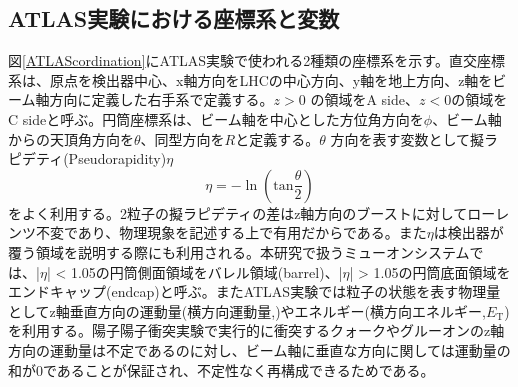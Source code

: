 \subsection{ATLAS実験における座標系と変数}
図\ref{ATLAScordination}にATLAS実験で使われる2種類の座標系を示す。直交座標系は、原点を検出器中心、x軸方向をLHCの中心方向、y軸を地上方向、z軸をビーム軸方向に定義した右手系で定義する。$z>0$ の領域をA side、$z<0$の領域をC sideと呼ぶ。円筒座標系は、ビーム軸を中心とした方位角方向を$\phi$、ビーム軸からの天頂角方向を$\theta$、同型方向を$R$と定義する。$\theta$ 方向を表す変数として擬ラピデティ(Pseudorapidity)$\eta$
\begin{equation}
    \eta = -\ln(\mathrm{tan}\frac{\theta}{2})
\end{equation}
をよく利用する。2粒子の擬ラピデティの差はz軸方向のブーストに対してローレンツ不変であり、物理現象を記述する上で有用だからである。また$\eta$は検出器が覆う領域を説明する際にも利用される。本研究で扱うミューオンシステムでは、|$\eta$| < 1.05の円筒側面領域をバレル領域(barrel)、|$\eta$| > 1.05の円筒底面領域をエンドキャップ(endcap)と呼ぶ。またATLAS実験では粒子の状態を表す物理量としてz軸垂直方向の運動量(横方向運動量,\pt)やエネルギー(横方向エネルギー,$E_{\mathrm{T}}$)を利用する。陽子陽子衝突実験で実行的に衝突するクォークやグルーオンのz軸方向の運動量は不定であるのに対し、ビーム軸に垂直な方向に関しては運動量の和が0であることが保証され、不定性なく再構成できるためである。
